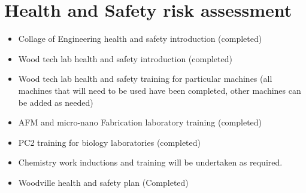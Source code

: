 \section{Health and Safety risk assessment}
\begin{itemize}
\item Collage of Engineering health and safety introduction (completed)
\end{itemize}

\begin{itemize}
\item Wood tech lab health and safety introduction (completed)
\end{itemize}

\begin{itemize}
\item Wood tech lab health and safety training for particular machines (all machines
that will need to be used have been completed, other machines can be added as
needed)
\end{itemize}

\begin{itemize}
\item AFM and micro-nano Fabrication laboratory training (completed)
\end{itemize}

\begin{itemize}
\item  PC2 training for biology laboratories (completed)
\end{itemize}

\begin{itemize}
\item Chemistry work inductions and training will be undertaken as required.
\end{itemize}
\begin{itemize}
\item Woodville health and safety plan (Completed)
\end{itemize}

  
  
